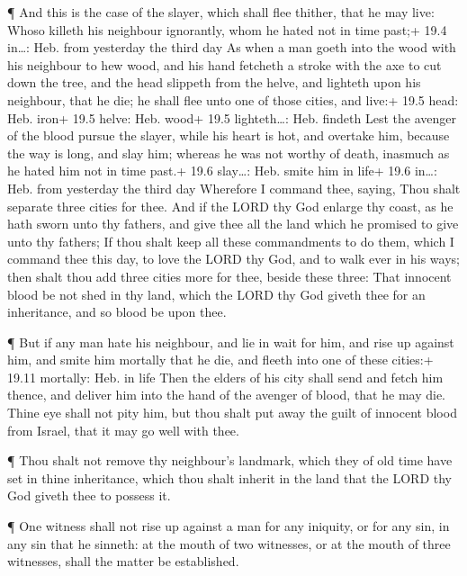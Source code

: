  ¶ And this is the case of the slayer, which shall flee
thither, that he may live: Whoso killeth his neighbour ignorantly, whom
he hated not in time past;+ 19.4 in\ldots: Heb. from yesterday the third
day  As when a man goeth into the wood with his neighbour to
hew wood, and his hand fetcheth a stroke with the axe to cut down the
tree, and the head slippeth from the helve, and lighteth upon his
neighbour, that he die; he shall flee unto one of those cities, and
live:+ 19.5 head: Heb. iron+ 19.5 helve: Heb. wood+ 19.5 lighteth\ldots:
Heb. findeth  Lest the avenger of the blood pursue the
slayer, while his heart is hot, and overtake him, because the way is
long, and slay him; whereas he was not worthy of death, inasmuch as he
hated him not in time past.+ 19.6 slay\ldots: Heb. smite him in life+
19.6 in\ldots: Heb. from yesterday the third day  Wherefore
I command thee, saying, Thou shalt separate three cities for thee.
 And if the LORD thy God enlarge thy coast, as he hath sworn
unto thy fathers, and give thee all the land which he promised to give
unto thy fathers;  If thou shalt keep all these commandments
to do them, which I command thee this day, to love the LORD thy God, and
to walk ever in his ways; then shalt thou add three cities more for
thee, beside these three:  That innocent blood be not shed
in thy land, which the LORD thy God giveth thee for an inheritance, and
so blood be upon thee.

 ¶ But if any man hate his neighbour, and lie in wait for
him, and rise up against him, and smite him mortally that he die, and
fleeth into one of these cities:+ 19.11 mortally: Heb. in life
 Then the elders of his city shall send and fetch him
thence, and deliver him into the hand of the avenger of blood, that he
may die.  Thine eye shall not pity him, but thou shalt put
away the guilt of innocent blood from Israel, that it may go well with
thee.

 ¶ Thou shalt not remove thy neighbour's landmark, which
they of old time have set in thine inheritance, which thou shalt inherit
in the land that the LORD thy God giveth thee to possess it.

 ¶ One witness shall not rise up against a man for any
iniquity, or for any sin, in any sin that he sinneth: at the mouth of
two witnesses, or at the mouth of three witnesses, shall the matter be
established.

